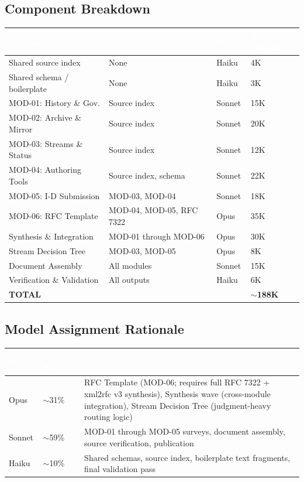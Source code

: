 \documentclass[11pt,letterpaper]{article}
\newcommand{\tableheader}[1]{\textbf{\sffamily\textcolor{white}{#1}}}
\begin{document}
\subsection{Component Breakdown}

\begin{center}
\begin{tabularx}{\textwidth}{L{3.5cm}L{2.5cm}C{1.5cm}C{1.5cm}}
\toprule
{}
\tableheader{Component} & \tableheader{Dependencies} & \tableheader{Model} & \tableheader{Est. Tokens} \\
\midrule
Shared source index & None & Haiku & 4K \\
Shared schema / boilerplate & None & Haiku & 3K \\
MOD-01: History \& Gov. & Source index & Sonnet & 15K \\
MOD-02: Archive \& Mirror & Source index & Sonnet & 20K \\
MOD-03: Streams \& Status & Source index & Sonnet & 12K \\
MOD-04: Authoring Tools & Source index, schema & Sonnet & 22K \\
MOD-05: I-D Submission & MOD-03, MOD-04 & Sonnet & 18K \\
MOD-06: RFC Template & MOD-04, MOD-05, RFC 7322 & Opus & 35K \\
Synthesis \& Integration & MOD-01 through MOD-06 & Opus & 30K \\
Stream Decision Tree & MOD-03, MOD-05 & Opus & 8K \\
Document Assembly & All modules & Sonnet & 15K \\
Verification \& Validation & All outputs & Haiku & 6K \\
\textbf{TOTAL} & & & \textbf{$\sim$188K} \\
\bottomrule
\end{tabularx}
\end{center}

\subsection{Model Assignment Rationale}

\begin{center}
\begin{tabularx}{\textwidth}{L{2cm}C{1.5cm}X}
\toprule
{}
\tableheader{Model} & \tableheader{\% Budget} & \tableheader{Assigned Tasks} \\
\midrule
Opus & $\sim$31\% & RFC Template (MOD-06; requires full RFC 7322 + xml2rfc v3 synthesis), Synthesis wave (cross-module integration), Stream Decision Tree (judgment-heavy routing logic) \\
Sonnet & $\sim$59\% & MOD-01 through MOD-05 surveys, document assembly, source verification, publication \\
Haiku & $\sim$10\% & Shared schemas, source index, boilerplate text fragments, final validation pass \\
\bottomrule
\end{tabularx}
\end{center}
\end{document}
